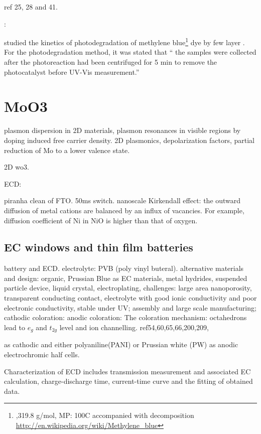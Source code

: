 ref 25, 28 and 41.

\textbf{}:

\citeauthor{Sreedhara2013} studied the kinetics of photodegradation of methylene blue\footnote{,319.8 g/mol, MP: 100C accompanied with decomposition \url{http://en.wikipedia.org/wiki/Methylene_blue}} dye by few layer .
For the photodegradation method, it was stated that `` the samples were collected after the photoreaction had been centrifuged for 5 min to remove the photocatalyst before UV-Vis measurement.''


\section{MoO3}

plasmon dispersion in 2D materials, plasmon resonances in visible regions by doping induced free carrier density. 2D plasmonics, depolarization factors, partial reduction of Mo to a lower valence state.   \cite{Alsaif2014a}

2D wo3.\cite{Kalantar-zadeh2010a} 


 ECD:

piranha clean of FTO. 50ms switch.\cite{Scherer2012} nanoscale Kirkendall effect: the outward diffusion of metal cations are balanced by an influx of vacancies. For example, diffusion coefficient of Ni in NiO is higher than that of oxygen.


\subsection{EC windows and thin film batteries}

battery and ECD.\cite{Granqvist2012} electrolyte: PVB (poly vinyl buteral).
alternative materials and design: organic, Prussian Blue as EC materials, metal hydrides, suspended particle device, liquid crystal, electroplating,
challenges: large area nanoporosity, transparent conducting contact, electrolyte with good ionic conductivity and poor electronic conductivity, stable under UV; assembly and large scale manufacturing;
cathodic coloration:
anodic coloration:
The coloration mechanism:  octahedrons lead to $e_g$ and $t_{2g}$ level and ion channelling.
ref54,60,65,66,200,209,


 as cathodic and either polyaniline(PANI) or Prussian white (PW) as anodic electrochromic half cells. \cite{Heckner2002}

Characterization of ECD includes transmission measurement and associated EC calculation, charge-discharge time, current-time curve and the fitting of obtained data.

